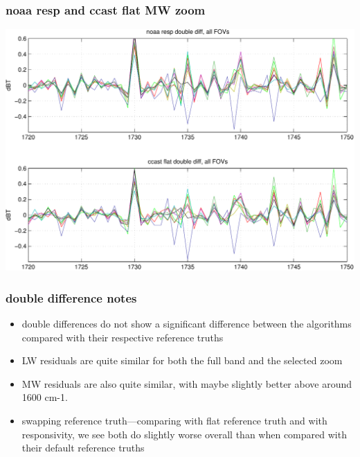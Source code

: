 \documentclass[11pt]{beamer}
\begin{document}
\begin{frame}
\frametitle{noaa resp and ccast flat MW zoom}
\begin{center}
  \includegraphics[scale=0.5]{figures/ddif_MW_zoom.pdf}
\end{center}
\end{frame}
\begin{frame}
\frametitle{double difference notes}

\begin{itemize}

  \item double differences do not show a significant difference
    between the algorithms compared with their respective reference
    truths


  \item LW residuals are quite similar for both the full band and
    the selected zoom

  \item MW residuals are also quite similar, with {\ccast} maybe
    slightly better above around 1600 cm-1.  

  \item swapping reference truth---comparing {\noaa} with flat
    reference truth and {\ccast} with responsivity, we see both do
    slightly worse overall than when compared with their default
    reference truths

\end{itemize}

\end{frame}
\end{document}
